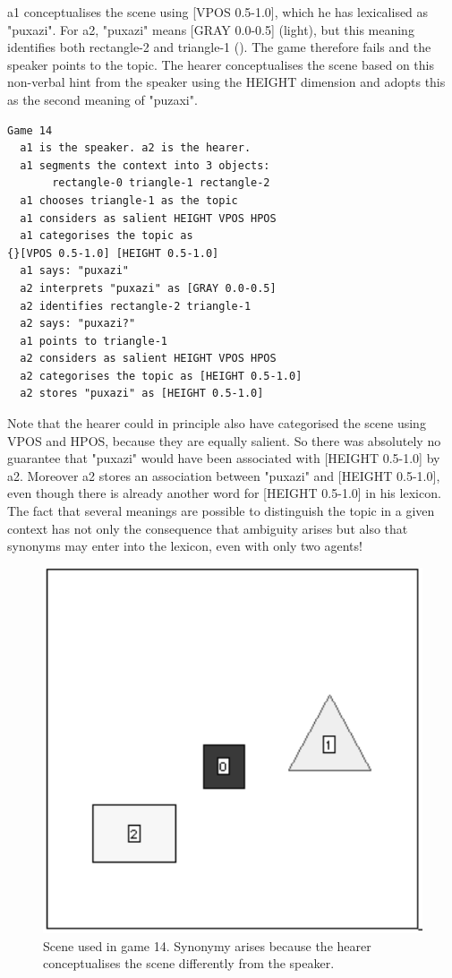 {\bfshape  a1} conceptualises the scene using 
{}[VPOS 0.5-1.0], which he has lexicalised as "puxazi". 
For {\bfshape  a2}, "puxazi" means [GRAY 0.0-0.5] (light), but this 
meaning identifies both rectangle-2 and
triangle-1 (). The game therefore
fails and the speaker points to the topic. The hearer
conceptualises the scene based on this non-verbal
hint from the speaker using the HEIGHT dimension and adopts this as the second meaning 
of "puzaxi". 
\begin{verbatim}
Game 14
  a1 is the speaker. a2 is the hearer. 
  a1 segments the context into 3 objects: 
       rectangle-0 triangle-1 rectangle-2
  a1 chooses triangle-1 as the topic 
  a1 considers as salient HEIGHT VPOS HPOS 
  a1 categorises the topic as 
{}[VPOS 0.5-1.0] [HEIGHT 0.5-1.0]
  a1 says: "puxazi"
  a2 interprets "puxazi" as [GRAY 0.0-0.5]
  a2 identifies rectangle-2 triangle-1
  a2 says: "puxazi?"
  a1 points to triangle-1
  a2 considers as salient HEIGHT VPOS HPOS 
  a2 categorises the topic as [HEIGHT 0.5-1.0]
  a2 stores "puxazi" as [HEIGHT 0.5-1.0]
\end{verbatim}
Note that the hearer could in principle 
also have categorised the
scene using VPOS and HPOS, because they are
equally salient. So there was absolutely no 
guarantee that "puxazi" would have been associated 
with [HEIGHT 0.5-1.0] by {\bfshape  a2}. Moreover {\bfshape  a2} stores
an association between "puxazi" and [HEIGHT 0.5-1.0], even though 
there is already another word for 
{}[HEIGHT 0.5-1.0] in his lexicon. The fact that 
several meanings are possible to distinguish the topic in a given 
context has not only the consequence that ambiguity
arises but also that synonyms may enter into the lexicon, 
even with only two agents!
\begin{figure}[htbp]
  \centerline{\includegraphics[width=.40\textwidth]{chap6/figs/scene-game14}}
\caption{\label{scene-game14} Scene used
in game 14. Synonymy arises because the hearer conceptualises
the scene differently from the speaker.}
\end{figure}

